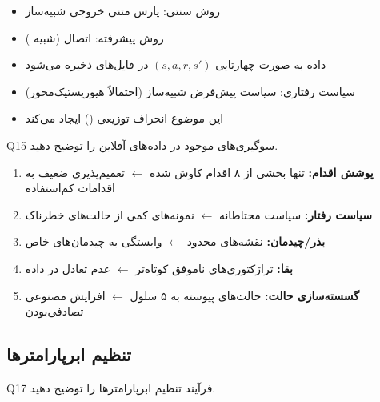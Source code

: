 \documentclass[oneside,openany,a4paper,12pt]{article}
\begin{document}
\begin{hintbox}
\begin{itemize}
  \item روش سنتی: پارس متنی خروجی شبیه‌ساز
  \item روش پیشرفته: اتصال  (شبیه )
  \item داده به صورت چهارتایی $(s, a, r, s')$ در فایل‌های  ذخیره می‌شود
  \item سیاست رفتاری: سیاست پیش‌فرض شبیه‌ساز (احتمالاً هیوریستیک‌محور)
  \item این موضوع انحراف توزیعی () ایجاد می‌کند
\end{itemize}
\end{hintbox}

\begin{questionbox}{Q15}
سوگیری‌های موجود در داده‌های آفلاین را توضیح دهید.
\end{questionbox}

\begin{hintbox}
\begin{enumerate}
  \item \textbf{پوشش اقدام:} تنها بخشی از ۸ اقدام کاوش شده $\leftarrow$ تعمیم‌پذیری ضعیف به اقدامات کم‌استفاده
  \item \textbf{سیاست رفتار:} سیاست محتاطانه $\leftarrow$ نمونه‌های کمی از حالت‌های خطرناک
  \item \textbf{بذر/چیدمان:} نقشه‌های محدود $\leftarrow$ وابستگی به چیدمان‌های خاص
  \item \textbf{بقا:} تراژکتوری‌های ناموفق کوتاه‌تر $\leftarrow$ عدم تعادل در داده
  \item \textbf{گسسته‌سازی حالت:} حالت‌های پیوسته به ۵ سلول $\leftarrow$ افزایش مصنوعی تصادفی‌بودن
\end{enumerate}
\end{hintbox}

\subsection{تنظیم ابرپارامترها}

\begin{questionbox}{Q17}
فرآیند تنظیم ابرپارامترها را توضیح دهید.
\end{questionbox}
\end{document}
